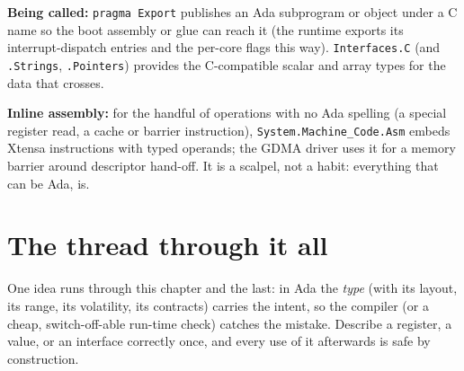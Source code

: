 \textbf{Being called:} \texttt{pragma Export} publishes an Ada subprogram or
object under a C name so the boot assembly or glue can reach it (the runtime
exports its interrupt-dispatch entries and the per-core flags this way).
\texttt{Interfaces.C} (and \texttt{.Strings}, \texttt{.Pointers}) provides the
C-compatible scalar and array types for the data that crosses.

\textbf{Inline assembly:} for the handful of operations with no Ada spelling
(a special register read, a cache or barrier instruction),
\texttt{System.Machine\_Code.Asm} embeds Xtensa instructions with typed operands;
the GDMA driver uses it for a memory barrier around descriptor hand-off. It is a
scalpel, not a habit: everything that can be Ada, is.

\section{The thread through it all}

One idea runs through this chapter and the last: in Ada the \emph{type} (with
its layout, its range, its volatility, its contracts) carries the intent, so the
compiler (or a cheap, switch-off-able run-time check) catches the mistake. Describe
a register, a value, or an interface correctly once, and every use of it afterwards
is safe by construction.
